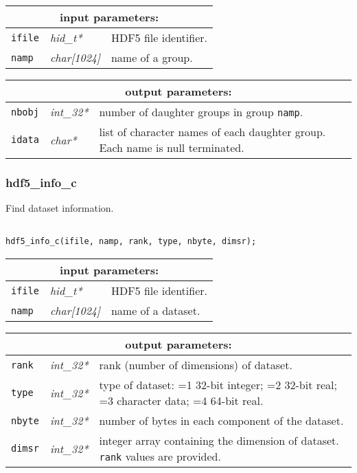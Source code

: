 \noindent
\begin{tabular}{|p{1.5cm}|p{2cm}|p{11cm}|}
\hline
\multicolumn{3}{|c|}{\bf input parameters:} \\
\hline
{\tt ifile} & {\it hid\_t*} & HDF5 file identifier. \\
\hline
{\tt namp} & {\it char[1024]} & name of a group. \\
\hline
\end{tabular}

\vskip 0.8cm

\noindent
\begin{tabular}{|p{1.5cm}|p{2cm}|p{11cm}|}
\hline
\multicolumn{3}{|c|}{\bf output parameters:} \\
\hline
{\tt nbobj} & {\it int\_32*} & number of daughter groups in group {\tt namp}. \\
\hline
{\tt idata} & {\it char*} & list of character names of each daughter group. Each name is null terminated. \\
\hline
\end{tabular}

\subsubsection{hdf5\_info\_c}

Find dataset information.

\begin{verbatim}

hdf5_info_c(ifile, namp, rank, type, nbyte, dimsr);
\end{verbatim}

\noindent
\begin{tabular}{|p{1.5cm}|p{2cm}|p{11cm}|}
\hline
\multicolumn{3}{|c|}{\bf input parameters:} \\
\hline
{\tt ifile} & {\it hid\_t*} & HDF5 file identifier. \\
\hline
{\tt namp} & {\it char[1024]} & name of a dataset. \\
\hline
\end{tabular}

\vskip 0.8cm

\noindent
\begin{tabular}{|p{1.5cm}|p{2cm}|p{11cm}|}
\hline
\multicolumn{3}{|c|}{\bf output parameters:} \\
\hline
{\tt rank} & {\it int\_32*} & rank (number of dimensions) of dataset. \\
\hline
{\tt type} & {\it int\_32*} & type of dataset: =1 32-bit integer; 
                                    =2 32-bit real; =3 character data; 
				    =4 64-bit real. \\
\hline
{\tt nbyte} & {\it int\_32*} & number of bytes in each component of the dataset. \\
\hline
{\tt dimsr} & {\it int\_32*} & integer array containing the dimension of dataset. {\tt rank} values are provided. \\
\hline
\end{tabular}

